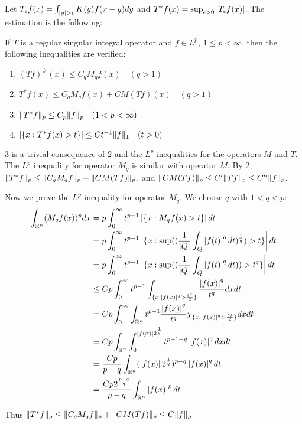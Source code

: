Let $T_\epsilon f(x)=\int_{\left\lvert y\right\rvert>\epsilon}{K(y)f(x-y)dy}$ and $T^*f(x)=\sup_{\epsilon>0}{\left\lvert T_\epsilon f(x)\right\rvert}$. The estimation is the following:
\begin{theorem}
    If $T$ is a regular singular integral operator and $f\in L^p$, $1\leq p<\infty$, then the following inequalities are verified:
    \begin{enumerate}
        \item $(Tf)^\#(x)\leq C_qM_qf(x)\quad (q>1)$
        \item $T^*f(x)\leq C_qM_qf(x)+CM(Tf)(x)\quad (q>1)$
        \item $\lVert T^*f\rVert_p\leq C_p\lVert f\rVert_p\quad (1<p<\infty)$
        \item $\left\lvert\{x:T^*f(x)>t\}\right\rvert\leq Ct^{-1}\lVert f\rVert_1\quad (t>0)$
    \end{enumerate}
\end{theorem}
\begin{remark}
    3 is a trivial consequence of 2 and the $L^p$ inequalities for the operators $M$ and $T$. The $L^p$ inequality for operator $M_q$ is similar with operator $M$.
    By 2, $\lVert T^*f\rVert_p\leq \lVert C_qM_qf\rVert_p+\lVert CM(Tf)\rVert_p$, and $\lVert CM(Tf)\rVert_p\leq C'\lVert Tf\rVert_p\leq C''\lVert f\rVert_p$.\par
    Now we prove the $L^p$ inequality for operator $M_q$. We choose $q$ with $1<q<p$:
        \begin{align*}
            \int_{\mathbb{R}^n}(M_q f(x))^p dx&=p\int_0^\infty  t^{p-1}\left\lvert\{x:M_qf(x)>t\}\right\rvert d t \\
            &=p\int_0^\infty  t^{p-1}\left\lvert\{x:\sup((\frac{1}{\left\lvert Q\right\rvert}\int_{Q}\left\lvert f(t)\right\rvert^q d t)^\frac{1}{q})>t\}\right\rvert d t\\
            &=p\int_0^\infty t^{p-1}\left\lvert\{x:\sup((\frac{1}{\left\lvert Q\right\rvert}\int_{Q}\left\lvert f(t)\right\rvert^q d t))>t^q\}\right\rvert d t\\
            &\leq C p\int_0^\infty t^{p-1}\int_{\{x:\left\lvert f(x)\right\rvert^q>\frac{t^q}{2}\}}\frac{\left\lvert f(x)\right\rvert^q}{t^q}d x d t\\
            &=C p\int_0^\infty \int_{\mathbb{R}^n}t^{p-1}\frac{\left\lvert f(x)\right\rvert^q}{t^q}\chi_{\{x:\left\lvert f(x)\right\rvert^q>\frac{t^q}{2}\}}dx d t\\
            &=C p\int_{\mathbb{R}^n}\int_0^{\left\lvert f(x)\right\rvert2^{\frac{1}{q}}} t^{p-1-q}\left\lvert f(x)\right\rvert^q d x d t\\
            &=\frac{Cp}{p-q}\int_{\mathbb{R}^n} (\left\lvert f(x)\right\rvert2^{\frac{1}{q}})^{p-q}\left\lvert f(x)\right\rvert^q d t\\
            &=\frac{Cp2^{\frac{p-q}{q}}}{p-q}\int_{\mathbb{R}^n}\left\lvert f(x)\right\rvert^p d t\\
        \end{align*}

 Thus $\lVert T^*f\rVert_p\leq \lVert C_qM_qf\rVert_p+\lVert CM(Tf)\rVert_p\leq C\lVert f\rVert_p$
\end{remark}

